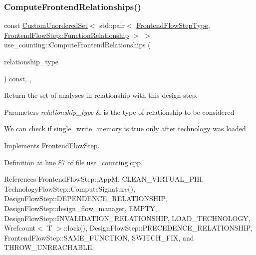 \subsubsection{\texorpdfstring{Compute\+Frontend\+Relationships()}{ComputeFrontendRelationships()}}
{\footnotesize\ttfamily const \hyperlink{classCustomUnorderedSet}{Custom\+Unordered\+Set}$<$ std\+::pair$<$ \hyperlink{frontend__flow__step_8hpp_afeb3716c693d2b2e4ed3e6d04c3b63bb}{Frontend\+Flow\+Step\+Type}, \hyperlink{classFrontendFlowStep_af7cf30f2023e5b99e637dc2058289ab0}{Frontend\+Flow\+Step\+::\+Function\+Relationship} $>$ $>$ use\+\_\+counting\+::\+Compute\+Frontend\+Relationships (\begin{DoxyParamCaption}\item[{const \hyperlink{classDesignFlowStep_a723a3baf19ff2ceb77bc13e099d0b1b7}{Design\+Flow\+Step\+::\+Relationship\+Type}}]{relationship\+\_\+type }\end{DoxyParamCaption}) const\hspace{0.3cm}{\ttfamily [override]}, {\ttfamily [private]}, {\ttfamily [virtual]}}



Return the set of analyses in relationship with this design step. 


\begin{DoxyParams}{Parameters}
{\em relationship\+\_\+type} & is the type of relationship to be considered \\
\hline
\end{DoxyParams}
We can check if single\+\_\+write\+\_\+memory is true only after technology was loaded 

Implements \hyperlink{classFrontendFlowStep_abeaff70b59734e462d347ed343dd700d}{Frontend\+Flow\+Step}.



Definition at line 87 of file use\+\_\+counting.\+cpp.



References Frontend\+Flow\+Step\+::\+AppM, C\+L\+E\+A\+N\+\_\+\+V\+I\+R\+T\+U\+A\+L\+\_\+\+P\+HI, Technology\+Flow\+Step\+::\+Compute\+Signature(), Design\+Flow\+Step\+::\+D\+E\+P\+E\+N\+D\+E\+N\+C\+E\+\_\+\+R\+E\+L\+A\+T\+I\+O\+N\+S\+H\+IP, Design\+Flow\+Step\+::design\+\_\+flow\+\_\+manager, E\+M\+P\+TY, Design\+Flow\+Step\+::\+I\+N\+V\+A\+L\+I\+D\+A\+T\+I\+O\+N\+\_\+\+R\+E\+L\+A\+T\+I\+O\+N\+S\+H\+IP, L\+O\+A\+D\+\_\+\+T\+E\+C\+H\+N\+O\+L\+O\+GY, Wrefcount$<$ T $>$\+::lock(), Design\+Flow\+Step\+::\+P\+R\+E\+C\+E\+D\+E\+N\+C\+E\+\_\+\+R\+E\+L\+A\+T\+I\+O\+N\+S\+H\+IP, Frontend\+Flow\+Step\+::\+S\+A\+M\+E\+\_\+\+F\+U\+N\+C\+T\+I\+ON, S\+W\+I\+T\+C\+H\+\_\+\+F\+IX, and T\+H\+R\+O\+W\+\_\+\+U\+N\+R\+E\+A\+C\+H\+A\+B\+LE.

